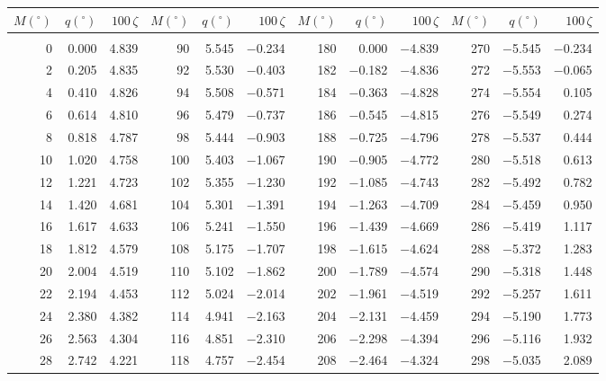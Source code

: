 \clearpage
\begin{table}[!h]\centering
\vspace{0.25cm}
\scriptsize{ \begin{tabular}{rrr|rrr|rrr|rrr}
$M(^\circ)$ & $q(^\circ)$  & $100\,\zeta$ & $M(^\circ)$ & $q(^\circ)$  & $100\,\zeta$ & $M(^\circ)$ & $q(^\circ)$  & $100\,\zeta$& $M(^\circ)$ & $q(^\circ)$  & $100\,\zeta$\\\hline
&&&&&&&&&&&\\[-1.75ex]
  0 &   0.000 &  4.839 &  90 &   5.545 & $-$0.234 & 180 &   0.000 & $-$4.839 & 270 &  $-$5.545 & $-$0.234\\
  2 &   0.205 &  4.835 &  92 &   5.530 & $-$0.403 & 182 &  $-$0.182 & $-$4.836 & 272 &  $-$5.553 & $-$0.065\\
  4 &   0.410 &  4.826 &  94 &   5.508 & $-$0.571 & 184 &  $-$0.363 & $-$4.828 & 274 &  $-$5.554 &  0.105\\
  6 &   0.614 &  4.810 &  96 &   5.479 & $-$0.737 & 186 &  $-$0.545 & $-$4.815 & 276 &  $-$5.549 &  0.274\\
  8 &   0.818 &  4.787 &  98 &   5.444 & $-$0.903 & 188 &  $-$0.725 & $-$4.796 & 278 &  $-$5.537 &  0.444\\
 10 &   1.020 &  4.758 & 100 &   5.403 & $-$1.067 & 190 &  $-$0.905 & $-$4.772 & 280 &  $-$5.518 &  0.613\\
 12 &   1.221 &  4.723 & 102 &   5.355 & $-$1.230 & 192 &  $-$1.085 & $-$4.743 & 282 &  $-$5.492 &  0.782\\
 14 &   1.420 &  4.681 & 104 &   5.301 & $-$1.391 & 194 &  $-$1.263 & $-$4.709 & 284 &  $-$5.459 &  0.950\\
 16 &   1.617 &  4.633 & 106 &   5.241 & $-$1.550 & 196 &  $-$1.439 & $-$4.669 & 286 &  $-$5.419 &  1.117\\
 18 &   1.812 &  4.579 & 108 &   5.175 & $-$1.707 & 198 &  $-$1.615 & $-$4.624 & 288 &  $-$5.372 &  1.283\\
 20 &   2.004 &  4.519 & 110 &   5.102 & $-$1.862 & 200 &  $-$1.789 & $-$4.574 & 290 &  $-$5.318 &  1.448\\
 22 &   2.194 &  4.453 & 112 &   5.024 & $-$2.014 & 202 &  $-$1.961 & $-$4.519 & 292 &  $-$5.257 &  1.611\\
 24 &   2.380 &  4.382 & 114 &   4.941 & $-$2.163 & 204 &  $-$2.131 & $-$4.459 & 294 &  $-$5.190 &  1.773\\
 26 &   2.563 &  4.304 & 116 &   4.851 & $-$2.310 & 206 &  $-$2.298 & $-$4.394 & 296 &  $-$5.116 &  1.932\\
 28 &   2.742 &  4.221 & 118 &   4.757 & $-$2.454 & 208 &  $-$2.464 & $-$4.324 & 298 &  $-$5.035 &  2.089\\

\end{tabular}}
\end{table}
